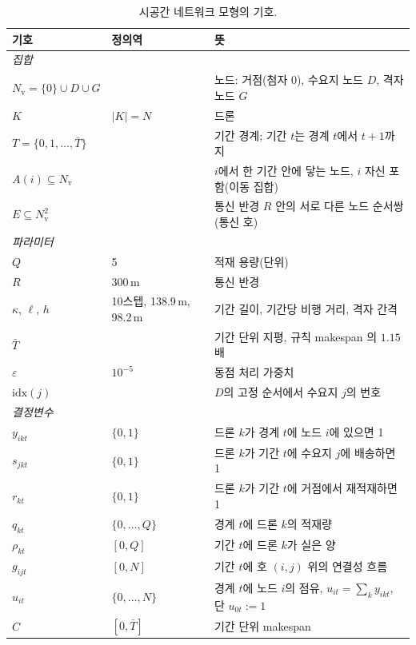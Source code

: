 \documentclass[final,5p,times,twocolumn]{elsarticle}
\begin{document}
\begin{table}[t]
\centering
\caption{시공간 네트워크 모형의 기호.}
\label{tab:notation}
\small
\begin{tabular}{llp{9.6cm}}
\toprule
기호 & 정의역 & 뜻 \\
\midrule
\multicolumn{3}{l}{\emph{집합}} \\
$N_{\mathrm{v}} = \{0\} \cup D \cup G$ & & 노드: 거점(첨자 0), 수요지 노드 $D$, 격자 노드 $G$ \\
$K$ & $|K| = N$ & 드론 \\
$T = \{0, 1, \dots, \bar T\}$ & & 기간 경계; 기간 $t$는 경계 $t$에서 $t+1$까지 \\
$A(i) \subseteq N_{\mathrm{v}}$ & & $i$에서 한 기간 안에 닿는 노드, $i$ 자신 포함(이동 집합) \\
$E \subseteq N_{\mathrm{v}}^2$ & & 통신 반경 $R$ 안의 서로 다른 노드 순서쌍(통신 호) \\
\midrule
\multicolumn{3}{l}{\emph{파라미터}} \\
$Q$ & 5 & 적재 용량(단위) \\
$R$ & 300\,m & 통신 반경 \\
$\kappa$, $\ell$, $h$ & 10스텝, 138.9\,m, 98.2\,m & 기간 길이, 기간당 비행 거리, 격자 간격 \\
$\bar T$ & & 기간 단위 지평, 규칙 makespan 의 $1.15$배 \\
$\varepsilon$ & $10^{-5}$ & 동점 처리 가중치 \\
$\mathrm{idx}(j)$ & & $D$의 고정 순서에서 수요지 $j$의 번호 \\
\midrule
\multicolumn{3}{l}{\emph{결정변수}} \\
$y_{ikt}$ & $\{0,1\}$ & 드론 $k$가 경계 $t$에 노드 $i$에 있으면 1 \\
$s_{jkt}$ & $\{0,1\}$ & 드론 $k$가 기간 $t$에 수요지 $j$에 배송하면 1 \\
$r_{kt}$ & $\{0,1\}$ & 드론 $k$가 기간 $t$에 거점에서 재적재하면 1 \\
$q_{kt}$ & $\{0,\dots,Q\}$ & 경계 $t$에 드론 $k$의 적재량 \\
$\rho_{kt}$ & $[0,Q]$ & 기간 $t$에 드론 $k$가 실은 양 \\
$g_{ijt}$ & $[0, N]$ & 기간 $t$에 호 $(i,j)$ 위의 연결성 흐름 \\
$u_{it}$ & $\{0,\dots,N\}$ & 경계 $t$에 노드 $i$의 점유, $u_{it} = \sum_k y_{ikt}$, 단 $u_{0t} := 1$ \\
$C$ & $[0,\bar T]$ & 기간 단위 makespan \\
\bottomrule
\end{tabular}
\end{table}
\end{document}
